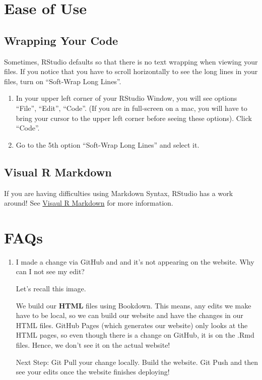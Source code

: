 \documentclass[
]{book}
\theoremstyle{definition}
\theoremstyle{definition}
\theoremstyle{definition}
\theoremstyle{definition}
\theoremstyle{remark}
\begin{document}
\section{Ease of Use}\label{ease-of-use}

\subsection{Wrapping Your Code}\label{wrapping-your-code}

Sometimes, RStudio defaults so that there is no text wrapping when viewing your files. If you notice that you have to scroll horizontally to see the long lines in your files, turn on ``Soft-Wrap Long Lines''.

\begin{enumerate}
\def\labelenumi{\arabic{enumi}.}
\item
  In your upper left corner of your RStudio Window, you will see options ``File'', ``Edit'', ``Code''. (If you are in full-screen on a mac, you will have to bring your cursor to the upper left corner before seeing these options). Click ``Code''.
\item
  Go to the 5th option ``Soft-Wrap Long Lines'' and select it.
\end{enumerate}

\subsection{Visual R Markdown}\label{visual-r-markdown}

If you are having difficulties using Markdown Syntax, RStudio has a work around! See \hyperref[visual-r-md]{Visaul R Markdown} for more information.

\section{FAQs}\label{faqs}

\begin{enumerate}
\def\labelenumi{\arabic{enumi}.}
\item
  I made a change via GitHub and and it's not appearing on the website. Why can I not see my edit?

  Let's recall this image.

  We build our \textbf{HTML} files using Bookdown. This means, any edits we make have to be local, so we can build our website and have the changes in our HTML files. GitHub Pages (which generates our website) only looks at the HTML pages, so even though there is a change on GitHub, it is on the .Rmd files. Hence, we don't see it on the actual website!

  Next Step: Git Pull your change locally. Build the website. Git Push and then see your edits once the website finishes deploying!
\end{enumerate}
\end{document}
